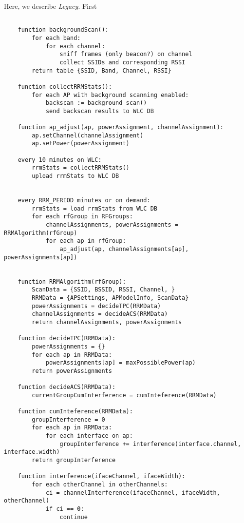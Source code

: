 Here, we describe \textit{Legacy}.
First

\begin{lstlisting}[language={[5.0]Lua}, caption=Legacy RRM algorithm, label=lst:legacy]

    function backgroundScan():
        for each band:
            for each channel:
                sniff frames (only beacon?) on channel
                collect SSIDs and corresponding RSSI
        return table {SSID, Band, Channel, RSSI}

    function collectRRMStats():
        for each AP with background scanning enabled:
            backscan := background_scan()
            send backscan results to WLC DB

    function ap_adjust(ap, powerAssignment, channelAssignment):
        ap.setChannel(channelAssignment)
        ap.setPower(powerAssignment)

    every 10 minutes on WLC:
        rrmStats = collectRRMStats()
        upload rrmStats to WLC DB


    every RRM_PERIOD minutes or on demand:
        rrmStats = load rrmStats from WLC DB
        for each rfGroup in RFGroups:
            channelAssignments, powerAssignments = RRMAlgorithm(rfGroup)
            for each ap in rfGroup:
                ap_adjust(ap, channelAssignments[ap], powerAssignments[ap])


    function RRMAlgorithm(rfGroup):
        ScanData = {SSID, BSSID, RSSI, Channel, }
        RRMData = {APSettings, APModelInfo, ScanData}
        powerAssignments = decideTPC(RRMData)
        channelAssignments = decideACS(RRMData)
        return channelAssignments, powerAssignments

    function decideTPC(RRMData):
        powerAssignments = {}
        for each ap in RRMData:
            powerAssignments[ap] = maxPossiblePower(ap)
        return powerAssignments

    function decideACS(RRMData):
        currentGroupCumInterference = cumInteference(RRMData)

    function cumInteference(RRMData):
        groupInterference = 0
        for each ap in RRMData:
            for each interface on ap:
                groupInterference += interference(interface.channel, interface.width)
        return groupInterference

    function interference(ifaceChannel, ifaceWidth):
        for each otherChannel in otherChannels:
            ci = channelInterference(ifaceChannel, ifaceWidth, otherChannel)
            if ci == 0:
                continue
            


\end{lstlisting}

